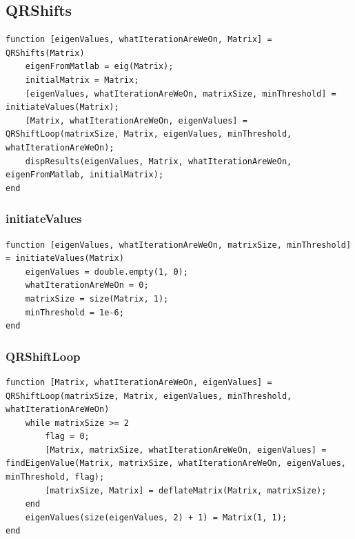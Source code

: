 \subsection{QRShifts}
\begin{simplechar}
\begin{lstlisting}
function [eigenValues, whatIterationAreWeOn, Matrix] = QRShifts(Matrix)
    eigenFromMatlab = eig(Matrix);
    initialMatrix = Matrix;
    [eigenValues, whatIterationAreWeOn, matrixSize, minThreshold] = initiateValues(Matrix);
    [Matrix, whatIterationAreWeOn, eigenValues] = QRShiftLoop(matrixSize, Matrix, eigenValues, minThreshold, whatIterationAreWeOn);
    dispResults(eigenValues, Matrix, whatIterationAreWeOn, eigenFromMatlab, initialMatrix);
end
\end{lstlisting}
\end{simplechar}

\subsubsection{initiateValues}
\begin{simplechar}
\begin{lstlisting}
function [eigenValues, whatIterationAreWeOn, matrixSize, minThreshold] = initiateValues(Matrix)
    eigenValues = double.empty(1, 0);
    whatIterationAreWeOn = 0;
    matrixSize = size(Matrix, 1);
    minThreshold = 1e-6;
end

\end{lstlisting}
\end{simplechar}

\newpage
\subsubsection{QRShiftLoop}
\begin{simplechar}
\begin{lstlisting}
function [Matrix, whatIterationAreWeOn, eigenValues] = QRShiftLoop(matrixSize, Matrix, eigenValues, minThreshold, whatIterationAreWeOn)
    while matrixSize >= 2
        flag = 0;
        [Matrix, matrixSize, whatIterationAreWeOn, eigenValues] = findEigenValue(Matrix, matrixSize, whatIterationAreWeOn, eigenValues, minThreshold, flag);
        [matrixSize, Matrix] = deflateMatrix(Matrix, matrixSize);
    end
    eigenValues(size(eigenValues, 2) + 1) = Matrix(1, 1);
end
\end{lstlisting}
\end{simplechar}

